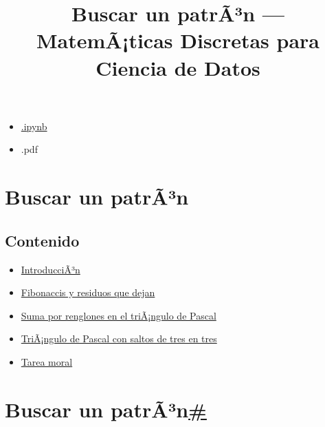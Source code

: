 \documentclass[
]{article}
\title{Buscar un patrÃ³n --- MatemÃ¡ticas Discretas para Ciencia de
Datos}
\author{}
\date{}
\providecommand{\tightlist}{%
  \setlength{\itemsep}{0pt}\setlength{\parskip}{0pt}}
\begin{document}
\maketitle

\label{main-content}
{}

\emph{}

\begin{itemize}
\tightlist
\item
  \href{../_sources/P1/BuscarPatron.ipynb}{{ \emph{} } {.ipynb}}
\item
  { \emph{} } {.pdf}
\end{itemize}

{ \emph{} }

{}

\label{jb-print-docs-body}
\section{Buscar un patrÃ³n}\label{buscar-un-patruxe3uxb3n}

\label{print-main-content}
\label{jb-print-toc}
\subsection{Contenido}\label{contenido}

\begin{itemize}
\tightlist
\item
  \hyperref[introduccion]{IntroducciÃ³n}
\item
  \hyperref[fibonaccis-y-residuos-que-dejan]{Fibonaccis y residuos que
  dejan}
\item
  \hyperref[suma-por-renglones-en-el-triangulo-de-pascal]{Suma por
  renglones en el triÃ¡ngulo de Pascal}
\item
  \hyperref[triangulo-de-pascal-con-saltos-de-tres-en-tres]{TriÃ¡ngulo
  de Pascal con saltos de tres en tres}
\item
  \hyperref[tarea-moral]{Tarea moral}
\end{itemize}

\label{searchbox}

\label{buscar-un-patron}
\section{\texorpdfstring{Buscar un
patrÃ³n\hyperref[buscar-un-patron]{\#}}{Buscar un patrÃ³n\#}}\label{buscar-un-patruxe3uxb3n-1}
\end{document}
